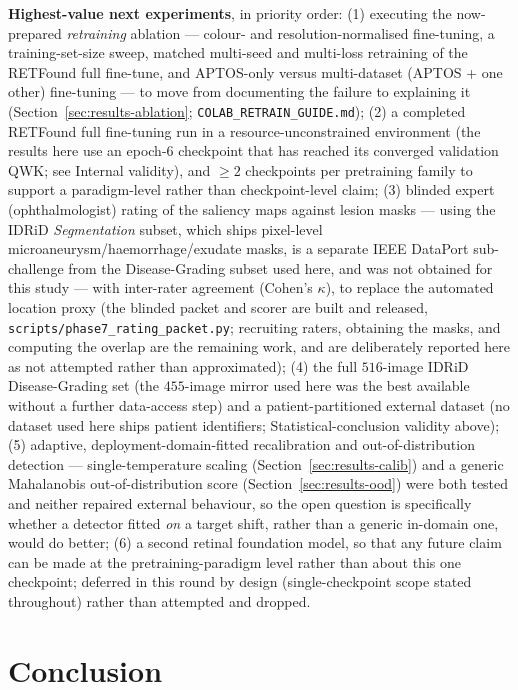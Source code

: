 \documentclass[journal]{IEEEtran}
\begin{document}
\textbf{Highest-value next experiments}, in priority order:
(1) executing the now-prepared \emph{retraining} ablation --- colour- and
resolution-normalised fine-tuning, a training-set-size sweep, matched multi-seed
and multi-loss retraining of the RETFound full fine-tune, and APTOS-only versus
multi-dataset (APTOS + one other) fine-tuning --- to move from documenting the
failure to explaining it (Section~\ref{sec:results-ablation};
\texttt{COLAB\_RETRAIN\_GUIDE.md});
(2) a completed RETFound full fine-tuning run in a resource-unconstrained
environment (the results here use an epoch-6 checkpoint that has reached its
converged validation QWK; see Internal validity), and $\geq 2$ checkpoints per
pretraining family to support a paradigm-level rather than checkpoint-level claim;
(3) blinded expert (ophthalmologist) rating of the saliency maps against
lesion masks --- using the IDRiD \emph{Segmentation} subset, which ships
pixel-level microaneurysm/haemorrhage/exudate masks, is a separate IEEE
DataPort sub-challenge from the Disease-Grading subset used here, and was not
obtained for this study --- with inter-rater agreement (Cohen's $\kappa$), to
replace the automated location proxy (the blinded packet and scorer are built
and released, \texttt{scripts/phase7\_rating\_packet.py}; recruiting raters,
obtaining the masks, and computing the overlap are the remaining work, and are
deliberately reported here as not attempted rather than approximated);
(4) the full $516$-image IDRiD Disease-Grading set (the $455$-image mirror used
here was the best available without a further data-access step) and a
patient-partitioned external dataset (no dataset used here ships patient
identifiers; Statistical-conclusion validity above);
(5) adaptive, deployment-domain-fitted recalibration and out-of-distribution
detection --- single-temperature scaling (Section~\ref{sec:results-calib}) and a
generic Mahalanobis out-of-distribution score (Section~\ref{sec:results-ood})
were both tested and neither repaired external behaviour, so the open question
is specifically whether a detector fitted \emph{on} a target shift, rather than
a generic in-domain one, would do better;
(6) a second retinal foundation model, so that any future claim can be made at
the pretraining-paradigm level rather than about this one checkpoint; deferred
in this round by design (single-checkpoint scope stated throughout) rather than
attempted and dropped.


\section{Conclusion}
\label{sec:conclusion}
\end{document}
